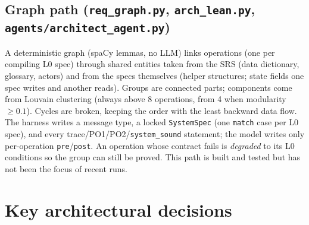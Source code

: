 \documentclass[11pt,a4paper]{article}
\newcommand{\code}[1]{\texttt{#1}}
\newcommand{\file}[1]{\texttt{#1}}
\begin{document}
\subsection{Graph path (\file{req\_graph.py}, \file{arch\_lean.py}, \file{agents/architect\_agent.py})}
A deterministic graph (spaCy lemmas, no LLM) links operations (one per compiling L0 spec)
through shared entities taken from the SRS (data dictionary, glossary, actors) and from the
specs themselves (helper structures; state fields one spec writes and another reads). Groups
are connected parts; components come from Louvain clustering (always above 8 operations, from 4
when modularity $\ge 0.1$). Cycles are broken, keeping the order with the least backward data
flow. The harness writes a message type, a locked \code{SystemSpec} (one \code{match} case per
L0 spec), and every trace/PO1/PO2/\code{system\_sound} statement; the model writes only
per-operation \code{pre}/\code{post}. An operation whose contract fails is \emph{degraded} to its
L0 conditions so the group can still be proved. This path is built and tested but has not been
the focus of recent runs.

\section{Key architectural decisions}
\label{sec:decisions}
\end{document}
